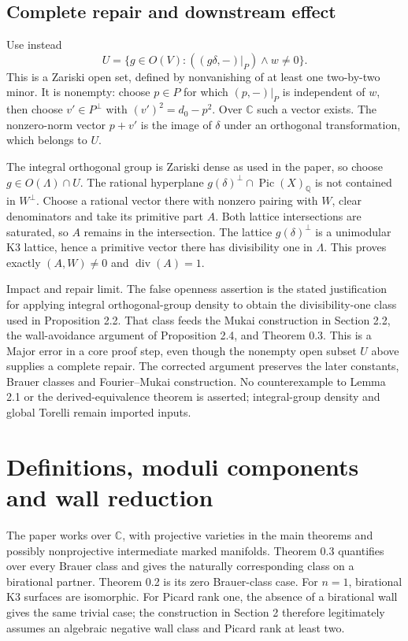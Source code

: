 \documentclass[10pt]{article}
\begin{document}
\subsection*{Complete repair and downstream effect}
Use instead \[U=\{g\in O(V):((g\delta,-)|_P)\wedge w\ne0\}.\] This is a Zariski open set, defined by nonvanishing of at least one two-by-two minor. It is nonempty: choose \(p\in P\) for which \((p,-)|_P\) is independent of \(w\), then choose \(v'\in P^\perp\) with \((v')^2=d_0-p^2\). Over \(\mathbb C\) such a vector exists. The nonzero-norm vector \(p+v'\) is the image of \(\delta\) under an orthogonal transformation, which belongs to \(U\).\par
The integral orthogonal group is Zariski dense as used in the paper, so choose \(g\in O(\Lambda)\cap U\). The rational hyperplane \(g(\delta)^\perp\cap\operatorname{Pic}(X)_\mathbb Q\) is not contained in \(W^\perp\). Choose a rational vector there with nonzero pairing with \(W\), clear denominators and take its primitive part \(A\). Both lattice intersections are saturated, so \(A\) remains in the intersection. The lattice \(g(\delta)^\perp\) is a unimodular K3 lattice, hence a primitive vector there has divisibility one in \(\Lambda\). This proves exactly \((A,W)\ne0\) and \(\operatorname{div}(A)=1\).\par
Impact and repair limit. The false openness assertion is the stated justification for applying integral orthogonal-group density to obtain the divisibility-one class used in Proposition 2.2. That class feeds the Mukai construction in Section 2.2, the wall-avoidance argument of Proposition 2.4, and Theorem 0.3. This is a Major error in a core proof step, even though the nonempty open subset \(U\) above supplies a complete repair. The corrected argument preserves the later constants, Brauer classes and Fourier–Mukai construction. No counterexample to Lemma 2.1 or the derived-equivalence theorem is asserted; integral-group density and global Torelli remain imported inputs.\par
\section*{Definitions, moduli components and wall reduction}
The paper works over \(\mathbb C\), with projective varieties in the main theorems and possibly nonprojective intermediate marked manifolds. Theorem 0.3 quantifies over every Brauer class and gives the naturally corresponding class on a birational partner. Theorem 0.2 is its zero Brauer-class case. For \(n=1\), birational K3 surfaces are isomorphic. For Picard rank one, the absence of a birational wall gives the same trivial case; the construction in Section 2 therefore legitimately assumes an algebraic negative wall class and Picard rank at least two.\par
\end{document}
